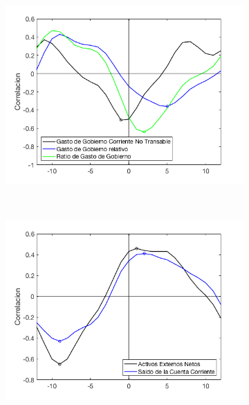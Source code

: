 \documentclass[12pt,letterpaper]{article}
\begin{document}
\begin{figure}
\captionsetup[subfigure]{aboveskip=-1pt,belowskip=-1pt}
\centering
\caption{Correlaciones}
\captionsetup[subfigure]{font=scriptsize,labelfont=scriptsize}
    \begin{subfigure}[b]{0.48\textwidth}
        \includegraphics[width=\textwidth]{fig14}
    \end{subfigure}
    ~ %
    \begin{subfigure}[b]{0.48\textwidth}
        \includegraphics[width=\textwidth]{fig15}
    \end{subfigure}


\end{figure}
\end{document}
